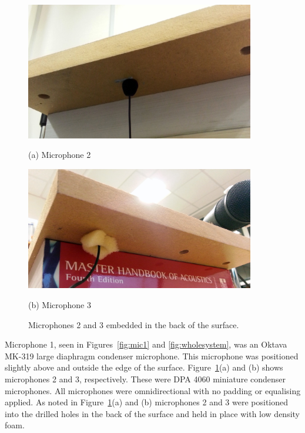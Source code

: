 \begin{figure}[t!]
\begin{minipage}[b]{1.0\linewidth}
  \centering
  \centerline{\includegraphics[width=10cm]{mic2}}%
  \centerline{(a) Microphone 2}\medskip
\end{minipage}
\begin{minipage}[b]{1.0\linewidth}
  \centering
  \centerline{\includegraphics[width=10cm]{mic3}}%
  \centerline{(b) Microphone 3}\medskip
\end{minipage}
\caption{Microphones 2 and 3 embedded in the back of the surface.}
\label{fig:mic23}
\end{figure}


Microphone 1, seen in Figures~\ref{fig:mic1} and \ref{fig:wholesystem}, was an Oktava MK-319 large diaphragm condenser microphone. This microphone was positioned slightly above and outside the edge of the surface. Figure~\ref{fig:mic23}(a) and (b) shows microphones 2 and 3, respectively. These were DPA 4060 miniature condenser microphones. All microphones were omnidirectional with no padding or equalising applied. As noted in Figure~\ref{fig:mic23}(a) and (b) microphones 2 and 3 were positioned into the drilled holes in the back of the surface and held in place with low density foam.


